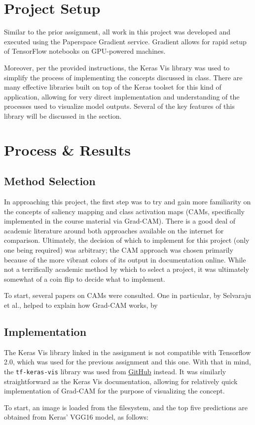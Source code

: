 \documentclass{article}
\begin{document}
  
  \graphicspath{{./images/}}

\section{Project Setup}
\par Similar to the prior assignment, all work in this project was developed and executed using the Paperspace Gradient service.
Gradient allows for rapid setup of TensorFlow notebooks on GPU-powered machines.
\par Moreover, per the provided instructions, the Keras Vis library was used to simplify the process of implementing the concepts discussed in class.
There are many effective libraries built on top of the Keras toolset for this kind of application, allowing for very direct implementation and understanding of the processes used to visualize model outputs.
Several of the key features of this library will be discussed in the  section.

\section{Process \& Results}
\subsection{Method Selection}
In approaching this project, the first step was to try and gain more familiarity on the concepts of saliency mapping and class activation maps (CAMs, specifically implemented in the course material via Grad-CAM).
There is a good deal of academic literature around both approaches available on the internet for comparison.
Ultimately, the decision of which to implement for this project (only one being required) was arbitrary; the CAM approach was chosen primarily because of the more vibrant colors of its output in documentation online.
While not a terrifically academic method by which to select a project, it was ultimately somewhat of a coin flip to decide what to implement.

\par To start, several papers on CAMs were consulted. One in particular, by Selvaraju et al., helped to explain how Grad-CAM works, by  \cite{Selvaraju2020}

\subsection{Implementation} \label{impl}
\par The Keras Vis library linked in the assignment is not compatible with Tensorflow 2.0, which was used for the previous assignment and this one.
With that in mind, the \lstinline{tf-keras-vis} library was used from \href{https://github.com/keisen/tf-keras-vis}{GitHub} instead.
It was similarly straightforward as the Keras Vis documentation, allowing for relatively quick implementation of Grad-CAM for the purpose of visualizing the concept.
\par To start, an image is loaded from the filesystem, and the top five predictions are obtained from Keras' VGG16 model, as follows:
\end{document}
